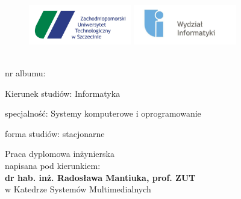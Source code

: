
\begin{titlepage}

 \begin{center}

\begin{figure}
\centering
\includegraphics[width=0.4\textwidth]{rys/zut.jpg}
\quad
\includegraphics[width=0.4\textwidth]{rys/wi.jpg}
\quad
\vspace{1.cm}
\end{figure}

\textbf{} \\ 

  	\vspace{0.5 cm}
      nr albumu: 
            
      
    \vspace{0.5 cm}
      Kierunek studiów: Informatyka 
      
    \vspace{0.5 cm}
      specjalność: Systemy komputerowe i oprogramowanie 
      
    \vspace{0.5 cm}
      forma studiów: stacjonarne 

  \vspace{2.cm}                   %
  
     \normalsize \textbf{} 
     
     
\vspace{0.5cm}     
          \normalsize \textbf{} 
       
     
\vspace{1.cm}
            Praca dyplomowa inżynierska \\
         napisana pod kierunkiem: \\
      \textbf{dr hab. inż. Radosława Mantiuka, prof. ZUT} \\
     w Katedrze Systemów Multimedialnych \\
  

\end{center}
\end{titlepage}
